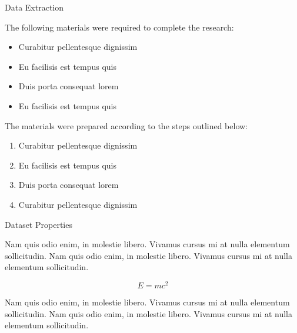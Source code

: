\documentclass[final]{beamer}
\newlength{\onecolwid}
\begin{document}
\begin{frame}[t]
\begin{columns}[t]
\begin{column}{\onecolwid} %



\begin{block}{Data Extraction}

The following materials were required to complete the research:

\begin{itemize}
\item Curabitur pellentesque dignissim
\item Eu facilisis est tempus quis
\item Duis porta consequat lorem
\item Eu facilisis est tempus quis
\end{itemize}

The materials were prepared according to the steps outlined below:

\begin{enumerate}
\item Curabitur pellentesque dignissim
\item Eu facilisis est tempus quis
\item Duis porta consequat lorem
\item Curabitur pellentesque dignissim
\end{enumerate}

\end{block}


\begin{block}{Dataset Properties}

Nam quis odio enim, in molestie libero. Vivamus cursus mi at nulla elementum sollicitudin. Nam quis odio enim, in molestie libero. Vivamus cursus mi at nulla elementum sollicitudin.
  
\begin{equation}
E = mc^{2}
\label{eqn:Einstein}
\end{equation}

Nam quis odio enim, in molestie libero. Vivamus cursus mi at nulla elementum sollicitudin. Nam quis odio enim, in molestie libero. Vivamus cursus mi at nulla elementum sollicitudin.


\end{block}
\end{column}
\end{columns}
\end{frame}
\end{document}

